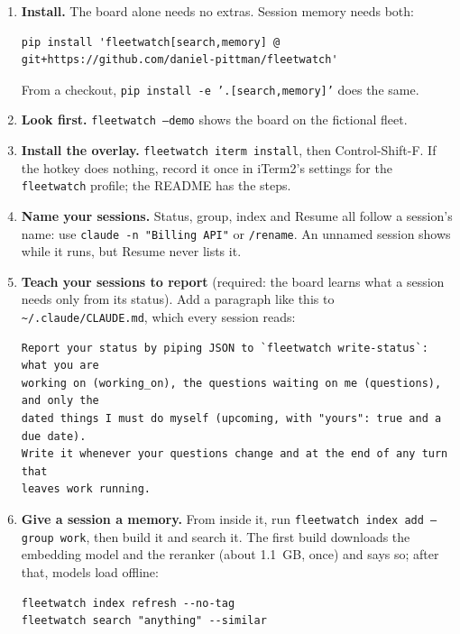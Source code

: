 \documentclass[11pt, letterpaper]{article}
\newenvironment{code}{\par\smallskip\small}{\par\smallskip}
\newcommand{\cmd}[1]{\texttt{#1}}
\begin{document}
\begin{enumerate}
  \item \textbf{Install.} The board alone needs no extras. Session memory needs both:
\begin{code}
\begin{verbatim}
pip install 'fleetwatch[search,memory] @ git+https://github.com/daniel-pittman/fleetwatch'
\end{verbatim}
\end{code}
    From a checkout, \cmd{pip install -e '.[search,memory]'} does the same.
  \item \textbf{Look first.} \cmd{fleetwatch --demo} shows the board on the fictional fleet.
  \item \textbf{Install the overlay.} \cmd{fleetwatch iterm install}, then Control-Shift-F. If
    the hotkey does nothing, record it once in iTerm2's settings for the \cmd{fleetwatch}
    profile; the README has the steps.
  \item \textbf{Name your sessions.} Status, group, index and Resume all follow a session's
    name: use \cmd{claude -n "Billing API"} or \cmd{/rename}. An unnamed session shows while
    it runs, but Resume never lists it.
  \item \textbf{Teach your sessions to report} (required: the board learns what a session
    needs only from its status). Add a paragraph like this to
    \cmd{\textasciitilde/.claude/CLAUDE.md}, which every session reads:
\begin{code}
\begin{verbatim}
Report your status by piping JSON to `fleetwatch write-status`: what you are
working on (working_on), the questions waiting on me (questions), and only the
dated things I must do myself (upcoming, with "yours": true and a due date).
Write it whenever your questions change and at the end of any turn that
leaves work running.
\end{verbatim}
\end{code}
  \item \textbf{Give a session a memory.} From inside it, run \cmd{fleetwatch index add
    --group work}, then build it and search it. The first build downloads the embedding model
    and the reranker (about 1.1~GB, once) and says so; after that, models load offline:
\begin{code}
\begin{verbatim}
fleetwatch index refresh --no-tag
fleetwatch search "anything" --similar
\end{verbatim}
\end{code}

\end{enumerate}
\end{document}
